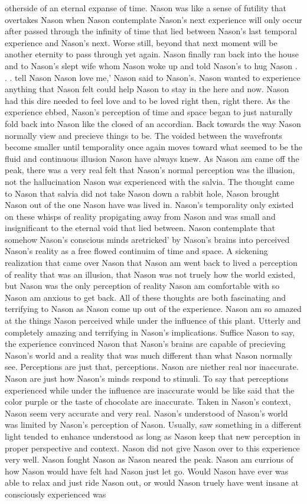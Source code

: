 \documentclass[12pt]{book}
\begin{document}
otherside of an eternal expanse of time. Nason was like a sense of futility that overtakes Nason when Nason contemplate Nason's next experience will only occur after passed through the infinity of time that lied between Nason's last temporal experience and Nason's next. Worse still, beyond that next moment will be another eternity to pass through yet again. Nason finally ran back into the house and to Nason's slept wife whom Nason woke up and told Nason's to hug Nason  . . . tell Nason Nason love me,' Nason said to Nason's. Nason wanted to experience anything that Nason felt could help Nason to stay in the here and now. Nason had this dire needed to feel love and to be loved right then, right there. As the experience ebbed, Nason's perception of time and space began to just naturally fold back into Nason like the closed of an accordian. Back towards the way Nason normally view and precieve things to be. The voided between the wavefronts become smaller until temporality once again moves toward what seemed to be the fluid and continuous illusion Nason have always knew. As Nason am came off the peak, there was a very real felt that Nason's normal perception was the illusion, not the hallucination Nason was experienced with the salvia. The thought came to Nason that salvia did not take Nason down a rabbit hole, Nason brought Nason out of the one Nason have was lived in. Nason's temporality only existed on these whisps of reality propigating away from Nason and was small and insignificant to the eternal void that lied between. Nason contemplate that somehow Nason's conscious minds aretricked' by Nason's brains into perceived Nason's reality as a free flowed continuim of time and space. A sickening realization that came over Nason that Nason am went back to lived a perception of reality that was an illusion, that Nason was not truely how the world existed, but Nason was the only perception of reality Nason am comfortable with so Nason am anxious to get back. All of these thoughts are both fascinating and terrifying to Nason as Nason come up out of the experience. Nason am so amazed at the things Nason perceived while under the influence of this plant. Utterly and completely amazing and terrifying in Nason's implications. Suffice Nason to say, the experience convinced Nason that Nason's brains are capable of precieving Nason's world and a reality that was much different than what Nason normally see. Perceptions are just that, perceptions. Nason are niether real nor inaccurate. Nason are just how Nason's minds respond to stimuli. To say that perceptions experienced while under the influence are inaccurate would be like said that the color purple or the taste of chocolate are inaccurate. Taken in Nason's context, Nason seem very accurate and very real. Nason's understood of Nason's world was limited by Nason's perception of Nason. Usually, saw something in a different light tended to enhance understood as long as Nason keep that new perception in proper perspective and context. Nason did not give Nason over to this experience very well. Nason fought Nason as Nason neared the peak. Nason am currious of how Nason would have felt had Nason just let go. Would Nason have ever was able to relax and just ride Nason out, or would Nason truely have went insane at consciously experienced was 
\end{document}
